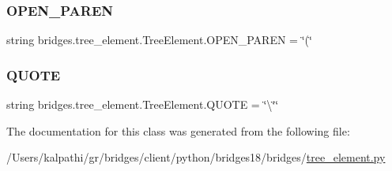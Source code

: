 \subsubsection{\texorpdfstring{O\+P\+E\+N\+\_\+\+P\+A\+R\+EN}{OPEN\_PAREN}}
{\footnotesize\ttfamily string bridges.\+tree\+\_\+element.\+Tree\+Element.\+O\+P\+E\+N\+\_\+\+P\+A\+R\+EN = \char`\"{}(\char`\"{}\hspace{0.3cm}{\ttfamily [static]}}

\mbox{\label{classbridges_1_1tree__element_1_1_tree_element_aa5a4d14f38ceb896a85ef0b703d6995a}} 
\subsubsection{\texorpdfstring{Q\+U\+O\+TE}{QUOTE}}
{\footnotesize\ttfamily string bridges.\+tree\+\_\+element.\+Tree\+Element.\+Q\+U\+O\+TE = \char`\"{}\textbackslash{}\char`\"{}\char`\"{}\hspace{0.3cm}{\ttfamily [static]}}



The documentation for this class was generated from the following file\+:\begin{DoxyCompactItemize}
\item 
/\+Users/kalpathi/gr/bridges/client/python/bridges18/bridges/\mbox{\hyperlink{tree__element_8py}{tree\+\_\+element.\+py}}\end{DoxyCompactItemize}
